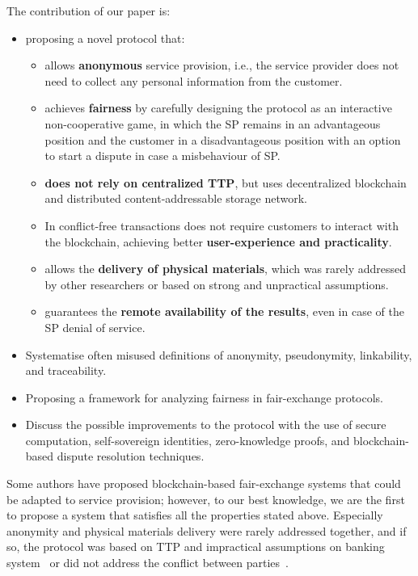 \documentclass[pdftex,twocolumn,epjc3]{svjour3}
\begin{document}
The contribution of our paper is:
\begin{itemize}
\item proposing a novel protocol that:
  \begin{itemize}
  \item allows \textbf{anonymous} service provision, i.e., the service provider does not need to collect any personal information from the customer.
  \item achieves \textbf{fairness} by carefully designing the protocol as an interactive non-cooperative game, in which the SP remains in an advantageous position and the customer in a disadvantageous position with an option to start a dispute in case a misbehaviour of SP.
  \item \textbf{does not rely on centralized TTP}, but uses decentralized blockchain and distributed content-addressable storage network.
  \item In conflict-free transactions does not require customers to interact with the blockchain, achieving better \textbf{user-experience and practicality}.
  \item allows the \textbf{delivery of physical materials}, which was rarely addressed by other researchers or based on strong and unpractical assumptions.
  \item guarantees the \textbf{remote availability of the results}, even in case of the SP denial of service.
  \end{itemize} 
\item Systematise often misused definitions of anonymity, pseudonymity, linkability, and traceability.
\item Proposing a framework for analyzing fairness in fair-exchange protocols.
\item Discuss the possible improvements to the protocol with the use of secure computation, self-sovereign identities, zero-knowledge proofs, and blockchain-based dispute resolution techniques.
\end{itemize} 

Some authors have proposed blockchain-based fair-exchange systems that could be adapted to service provision; however, to our best knowledge, we are the first to propose a system that satisfies all the properties stated above. Especially anonymity and physical materials delivery were rarely addressed together, and if so, the protocol was based on TTP and impractical assumptions on banking system~\cite{birjoveanuAnonymityFairexchangeEcommerce2015} or did not address the conflict between parties~\cite{altawyLelantosBlockchainBasedAnonymous2017}.
\end{document}
